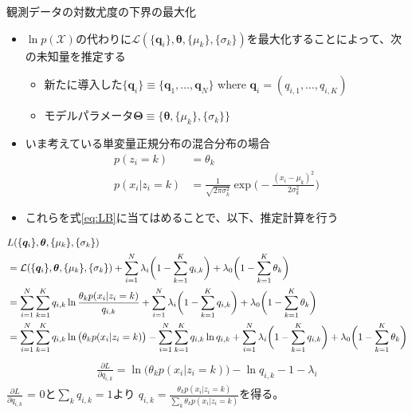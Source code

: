\documentclass[aspectratio=169,unicode,dvipdfmx,14pt]{beamer}
\begin{document}
\begin{frame}{観測データの対数尤度の下界の最大化}
\begin{itemize}
\item $\ln p(\mathcal{X})$の代わりに$\mathcal{L}(\{ \bm{q}_i \},\bm{\theta},\{\mu_k\},\{\sigma_k\})$を最大化することによって、次の未知量を推定する
\begin{itemize}
\item 新たに導入した$\{ \bm{q}_i \} \equiv \{ \bm{q}_1, \ldots, \bm{q}_N \}$ where $\bm{q}_i=(q_{i,1},\ldots,q_{i,K})$
\item モデルパラメータ$\bm{\Theta} \equiv \{ \bm{\theta}, \{ \mu_k \}, \{ \sigma_k \} \}$
\end{itemize}
\item いま考えている単変量正規分布の混合分布の場合
\begin{align}
p(z_i=k) & = \theta_k \\
p(x_i | z_i=k) & = \frac{1}{\sqrt{2\pi\sigma_k^2}} \exp \bigg( - \frac{ ( x_i - \mu_k)^2 }{ 2\sigma_k^2 } \bigg)
\end{align}
\item これらを式\eqref{eq:LB}に当てはめることで、以下、推定計算を行う
\end{itemize}
\end{frame}

\begin{frame}
\FontMath
\begin{align}
& L(\{ \bm{q}_i \},\bm{\theta},\{\mu_k\},\{\sigma_k\}) 
\notag \\ &
= \mathcal{L}(\{ \bm{q}_i \},\bm{\theta},\{\mu_k\},\{\sigma_k\})
+ \sum_{i=1}^N \lambda_i \bigg(1 - \sum_{k=1}^K q_{i,k}\bigg)
+ \lambda_0 \bigg( 1 - \sum_{k=1}^K \theta_k \bigg)
\notag \\ &
= \sum_{i=1}^N \sum_{k=1}^K q_{i,k} \ln\frac{\theta_k p(x_i | z_i = k)}{q_{i,k}}
+ \sum_{i=1}^N \lambda_i \bigg(1 - \sum_{k=1}^K q_{i,k}\bigg)
+ \lambda_0 \bigg( 1 - \sum_{k=1}^K \theta_k \bigg)
\notag \\ &
= 
\sum_{i=1}^N \sum_{k=1}^K q_{i,k} \ln \big( \theta_k p(x_i | z_i = k) \big)
- \sum_{i=1}^N \sum_{k=1}^K q_{i,k} \ln q_{i,k}
+ \sum_{i=1}^N \lambda_i \bigg(1 - \sum_{k=1}^K q_{i,k}\bigg)
+ \lambda_0 \bigg( 1 - \sum_{k=1}^K \theta_k \bigg)
\end{align}
\begin{align}
\frac{\partial L}{\partial q_{i,k}}
= \ln \big( \theta_k p(x_i | z_i = k) \big) - \ln q_{i,k} - 1 - \lambda_i
\end{align}
$\frac{\partial L}{\partial q_{i,k}}$ = 0と$\sum_k q_{i,k}=1$より
$q_{i,k} = \frac{ \theta_k p(x_i | z_i = k) }{ \sum_k \theta_k p(x_i | z_i = k) }$を得る。
\end{frame}
\end{document}
